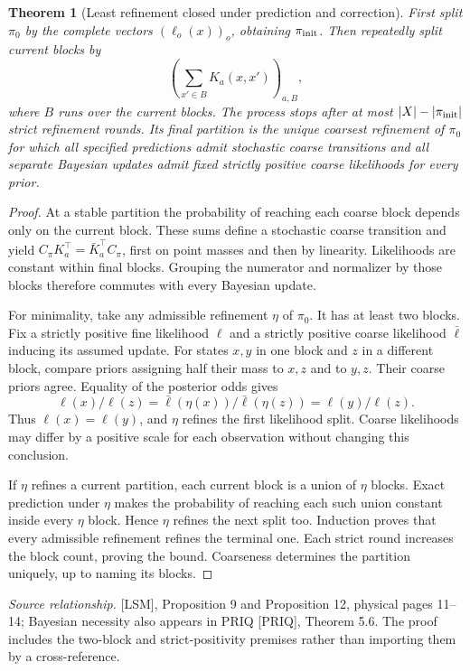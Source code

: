 \documentclass[11pt,oneside,openany]{book}
\newtheorem{theorem}{Theorem}[chapter]
\theoremstyle{definition}\newtheorem{definition}[theorem]{Definition}
\newcommand{\source}[1]{\par{\small\textit{Source relationship.} #1}\par}
\begin{document}
\begin{theorem}[Least refinement closed under prediction and correction]\label{r:joint-refinement}
First split $\pi_0$ by the complete vectors $(\ell_o(x))_o$, obtaining $\pi_{\rm init}$. Then repeatedly split current blocks by
\[
 \left(\sum_{x'\in B}K_a(x,x')\right)_{a,B},
\]
where $B$ runs over the current blocks. The process stops after at most $|X|-|\pi_{\rm init}|$ strict refinement rounds. Its final partition is the unique coarsest refinement of $\pi_0$ for which all specified predictions admit stochastic coarse transitions and all separate Bayesian updates admit fixed strictly positive coarse likelihoods for every prior.
\end{theorem}
\begin{proof}
At a stable partition the probability of reaching each coarse block depends only on the current block. These sums define a stochastic coarse transition and yield $C_\pi K_a^\top=\bar K_a^\top C_\pi$, first on point masses and then by linearity. Likelihoods are constant within final blocks. Grouping the numerator and normalizer by those blocks therefore commutes with every Bayesian update.

For minimality, take any admissible refinement $\eta$ of $\pi_0$. It has at least two blocks. Fix a strictly positive fine likelihood $\ell$ and a strictly positive coarse likelihood $\bar\ell$ inducing its assumed update. For states $x,y$ in one block and $z$ in a different block, compare priors assigning half their mass to $x,z$ and to $y,z$. Their coarse priors agree. Equality of the posterior odds gives
\[
 \ell(x)/\ell(z)=\bar\ell(\eta(x))/\bar\ell(\eta(z))=\ell(y)/\ell(z).
\]
Thus $\ell(x)=\ell(y)$, and $\eta$ refines the first likelihood split. Coarse likelihoods may differ by a positive scale for each observation without changing this conclusion.

If $\eta$ refines a current partition, each current block is a union of $\eta$ blocks. Exact prediction under $\eta$ makes the probability of reaching each such union constant inside every $\eta$ block. Hence $\eta$ refines the next split too. Induction proves that every admissible refinement refines the terminal one. Each strict round increases the block count, proving the bound. Coarseness determines the partition uniquely, up to naming its blocks.
\end{proof}
\source{[LSM], Proposition 9 and Proposition 12, physical pages 11--14; Bayesian necessity also appears in PRIQ [PRIQ], Theorem 5.6. The proof includes the two-block and strict-positivity premises rather than importing them by a cross-reference.}
\end{document}
